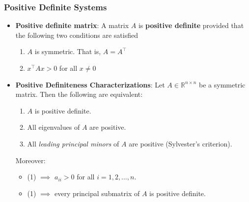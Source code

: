 \documentclass{report}
\begin{document}
    \pagebreak 
    \subsubsection{Positive Definite Systems}
    \begin{itemize}
            \item \textbf{Positive definite matrix}: A matrix $A$ is \textbf{positive definite} provided that the following two conditions are satisfied
            \begin{enumerate}
                \item $A$ is symmetric. That is, $A = A^{\top} $
                \item $x^{\top}Ax > 0 $ for all $x\ne 0$
            \end{enumerate}
        \item \textbf{Positive Definiteness Characterizations}:  
            Let $A \in \mathbb{R}^{n \times n}$ be a symmetric matrix. Then the following are equivalent:  
            \begin{enumerate}
                \item $A$ is positive definite.  
                \item All eigenvalues of $A$ are positive.  
                \item All \emph{leading principal minors} of $A$ are positive (Sylvester’s criterion).  
            \end{enumerate}  
            Moreover:  
            \begin{itemize}
                \item (1) $\implies$ $a_{ii} > 0$ for all $i=1,2,\dots,n$.  
                \item (1) $\implies$ every principal submatrix of $A$ is positive definite.  
            \end{itemize}


\end{itemize}
\end{document}
